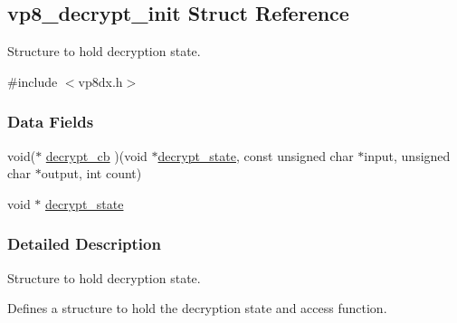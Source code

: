 \hypertarget{structvp8__decrypt__init}{\subsection{vp8\+\_\+decrypt\+\_\+init Struct Reference}
\label{structvp8__decrypt__init}
}


Structure to hold decryption state.  




{\ttfamily \#include $<$vp8dx.\+h$>$}

\subsubsection*{Data Fields}
\begin{DoxyCompactItemize}
\item 
void($\ast$ \hyperlink{structvp8__decrypt__init_ae8eaa106b6567813006a0afb5a46a36c}{decrypt\+\_\+cb} )(void $\ast$\hyperlink{structvp8__decrypt__init_a1bb41a1fbd95eaccc79a322dc4c6685d}{decrypt\+\_\+state}, const unsigned char $\ast$input, unsigned char $\ast$output, int count)
\item 
void $\ast$ \hyperlink{structvp8__decrypt__init_a1bb41a1fbd95eaccc79a322dc4c6685d}{decrypt\+\_\+state}
\end{DoxyCompactItemize}


\subsubsection{Detailed Description}
Structure to hold decryption state. 

Defines a structure to hold the decryption state and access function. 

